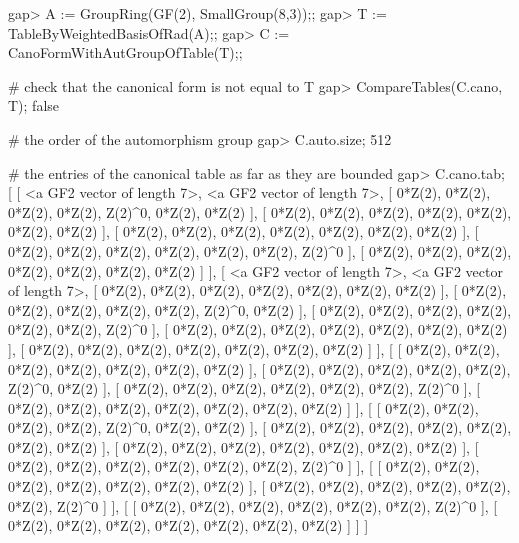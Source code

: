 \beginexample
gap> A := GroupRing(GF(2), SmallGroup(8,3));;
gap> T := TableByWeightedBasisOfRad(A);;
gap> C := CanoFormWithAutGroupOfTable(T);;

# check that the canonical form is not equal to T
gap> CompareTables(C.cano, T);
false

# the order of the automorphism group
gap> C.auto.size;
512

# the entries of the canonical table as far as they are bounded
gap> C.cano.tab;
[ [ <a GF2 vector of length 7>, <a GF2 vector of length 7>, 
      [ 0*Z(2), 0*Z(2), 0*Z(2), 0*Z(2), Z(2)^0, 0*Z(2), 0*Z(2) ], 
      [ 0*Z(2), 0*Z(2), 0*Z(2), 0*Z(2), 0*Z(2), 0*Z(2), 0*Z(2) ], 
      [ 0*Z(2), 0*Z(2), 0*Z(2), 0*Z(2), 0*Z(2), 0*Z(2), 0*Z(2) ], 
      [ 0*Z(2), 0*Z(2), 0*Z(2), 0*Z(2), 0*Z(2), 0*Z(2), Z(2)^0 ], 
      [ 0*Z(2), 0*Z(2), 0*Z(2), 0*Z(2), 0*Z(2), 0*Z(2), 0*Z(2) ] ], 
  [ <a GF2 vector of length 7>, <a GF2 vector of length 7>, 
      [ 0*Z(2), 0*Z(2), 0*Z(2), 0*Z(2), 0*Z(2), 0*Z(2), 0*Z(2) ], 
      [ 0*Z(2), 0*Z(2), 0*Z(2), 0*Z(2), 0*Z(2), Z(2)^0, 0*Z(2) ], 
      [ 0*Z(2), 0*Z(2), 0*Z(2), 0*Z(2), 0*Z(2), 0*Z(2), Z(2)^0 ], 
      [ 0*Z(2), 0*Z(2), 0*Z(2), 0*Z(2), 0*Z(2), 0*Z(2), 0*Z(2) ], 
      [ 0*Z(2), 0*Z(2), 0*Z(2), 0*Z(2), 0*Z(2), 0*Z(2), 0*Z(2) ] ], 
  [ [ 0*Z(2), 0*Z(2), 0*Z(2), 0*Z(2), 0*Z(2), 0*Z(2), 0*Z(2) ], 
      [ 0*Z(2), 0*Z(2), 0*Z(2), 0*Z(2), 0*Z(2), Z(2)^0, 0*Z(2) ], 
      [ 0*Z(2), 0*Z(2), 0*Z(2), 0*Z(2), 0*Z(2), 0*Z(2), Z(2)^0 ], 
      [ 0*Z(2), 0*Z(2), 0*Z(2), 0*Z(2), 0*Z(2), 0*Z(2), 0*Z(2) ] ], 
  [ [ 0*Z(2), 0*Z(2), 0*Z(2), 0*Z(2), Z(2)^0, 0*Z(2), 0*Z(2) ], 
      [ 0*Z(2), 0*Z(2), 0*Z(2), 0*Z(2), 0*Z(2), 0*Z(2), 0*Z(2) ], 
      [ 0*Z(2), 0*Z(2), 0*Z(2), 0*Z(2), 0*Z(2), 0*Z(2), 0*Z(2) ], 
      [ 0*Z(2), 0*Z(2), 0*Z(2), 0*Z(2), 0*Z(2), 0*Z(2), Z(2)^0 ] ], 
  [ [ 0*Z(2), 0*Z(2), 0*Z(2), 0*Z(2), 0*Z(2), 0*Z(2), 0*Z(2) ], 
      [ 0*Z(2), 0*Z(2), 0*Z(2), 0*Z(2), 0*Z(2), 0*Z(2), Z(2)^0 ] ], 
  [ [ 0*Z(2), 0*Z(2), 0*Z(2), 0*Z(2), 0*Z(2), 0*Z(2), Z(2)^0 ], 
      [ 0*Z(2), 0*Z(2), 0*Z(2), 0*Z(2), 0*Z(2), 0*Z(2), 0*Z(2) ] ] ]
\endexample
